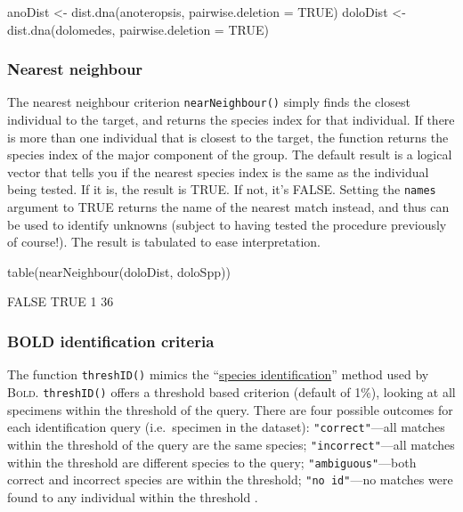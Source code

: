 \documentclass{article}
\newcommand{\progname}[1]{\textsc{#1}}
\newcommand{\fun}[1]{\texttt{#1}}
\begin{document}
\begin{console}
anoDist <- dist.dna(anoteropsis, pairwise.deletion = TRUE)
doloDist <- dist.dna(dolomedes, pairwise.deletion = TRUE)
\end{console}

\subsubsection{Nearest neighbour}
The nearest neighbour criterion \fun{nearNeighbour()} simply finds the closest individual to the target, and returns the species index for that individual. If there is more than one individual that is closest to the target, the function returns the species index of the major component of the group. The default result is a logical vector that tells you if the nearest species index is the same as the individual being tested. If it is, the result is TRUE. If not, it's FALSE. Setting the \fun{names} argument to TRUE returns the name of the nearest match instead, and thus can be used to identify unknowns (subject to having tested the procedure previously of course!). The result is tabulated to ease interpretation.

\begin{console}
table(nearNeighbour(doloDist, doloSpp))
\end{console}

\begin{Routput}
FALSE  TRUE 
    1    36 
\end{Routput}

\subsubsection{BOLD identification criteria}%
The function \fun{threshID()} mimics the ``\href{http://www.barcodinglife.com/views/idrequest.php}{species identification}'' method used by \progname{Bold}. \fun{threshID()} offers a threshold based criterion (default of 1\%), looking at all specimens within the threshold of the query. There are four possible outcomes for each identification query (i.e.\ specimen in the dataset): \fun{"correct"}---all matches within the threshold of the query are the same species; \fun{"incorrect"}---all matches within the threshold are different species to the query; \fun{"ambiguous"}---both correct and incorrect species are within the threshold; \fun{"no id"}---no matches were found to any individual within the threshold . 
\end{document}
